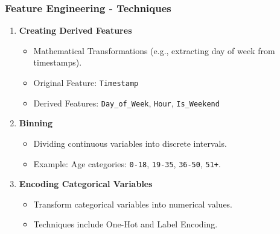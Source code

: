 \documentclass[aspectratio=169]{beamer}
\begin{document}
\begin{frame}[fragile]
    \frametitle{Feature Engineering - Techniques}
    \begin{enumerate}
        \item \textbf{Creating Derived Features}
            \begin{itemize}
                \item Mathematical Transformations (e.g., extracting day of week from timestamps).
                \item Original Feature: \texttt{Timestamp}
                \item Derived Features: \texttt{Day\_of\_Week}, \texttt{Hour}, \texttt{Is\_Weekend}
            \end{itemize}
        
        \item \textbf{Binning}
            \begin{itemize}
                \item Dividing continuous variables into discrete intervals.
                \item Example: Age categories: \texttt{0-18}, \texttt{19-35}, \texttt{36-50}, \texttt{51+}.
            \end{itemize}

        \item \textbf{Encoding Categorical Variables}
            \begin{itemize}
                \item Transform categorical variables into numerical values.
                \item Techniques include One-Hot and Label Encoding.
            \end{itemize}
    \end{enumerate}
\end{frame}
\end{document}

